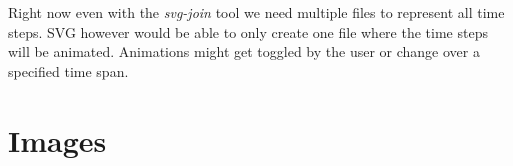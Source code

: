 \documentclass[a4paper, 12pt, bibliography=totoc]{scrartcl}
\begin{document}
Right now even with the \textit{svg-join} tool we need multiple files to represent all time steps. SVG however would be able to only create one file where the time steps will be animated. Animations might get toggled by the user or change over a specified time span.
\newpage
\appendix
\section{Images}
\end{document}

